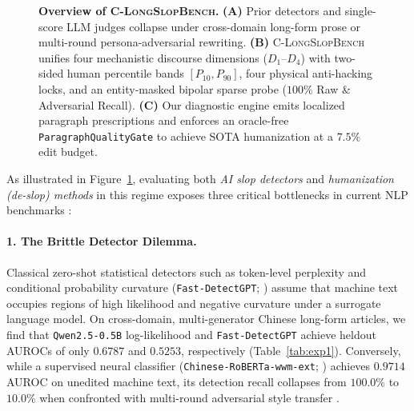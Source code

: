 \documentclass[11pt]{article}
\newcommand{\bench}{\textsc{C-LongSlopBench}}
\newcommand{\gate}{\texttt{ParagraphQualityGate}}
\begin{document}
\begin{figure}[t]
{%
}
\caption{\textbf{Overview of \bench{}.} \textbf{(A)} Prior detectors and single-score LLM judges collapse under cross-domain long-form prose or multi-round persona-adversarial rewriting. \textbf{(B)} \bench{} unifies four mechanistic discourse dimensions ($D_1$--$D_4$) with two-sided human percentile bands $[P_{10}, P_{90}]$, four physical anti-hacking locks, and an entity-masked bipolar sparse probe ($100\%$ Raw \& Adversarial Recall). \textbf{(C)} Our diagnostic engine emits localized paragraph prescriptions and enforces an oracle-free \gate{} to achieve SOTA humanization at a $7.5\%$ edit budget.}
\label{fig:overview}
\end{figure}

As illustrated in Figure~\ref{fig:overview}, evaluating both \textit{AI slop detectors} and \textit{humanization (de-slop) methods} in this regime exposes three critical bottlenecks in current NLP benchmarks \cite{dugan2024raid,li2024mage}:

\paragraph{1. The Brittle Detector Dilemma.}
Classical zero-shot statistical detectors such as token-level perplexity and conditional probability curvature (\texttt{Fast-DetectGPT}; \citealt{bao2024fastdetectgpt}) assume that machine text occupies regions of high likelihood and negative curvature under a surrogate language model. On cross-domain, multi-generator Chinese long-form articles, we find that \texttt{Qwen2.5-0.5B} log-likelihood and \texttt{Fast-DetectGPT} achieve heldout AUROCs of only $0.6787$ and $0.5253$, respectively (Table~\ref{tab:exp1}). Conversely, while a supervised neural classifier (\texttt{Chinese-RoBERTa-wwm-ext}; \citealt{cui2021pre}) achieves $0.9714$ AUROC on unedited machine text, its detection recall collapses from $100.0\%$ to $10.0\%$ when confronted with multi-round adversarial style transfer \cite{ttm2025,impersona2025}.
\end{document}
